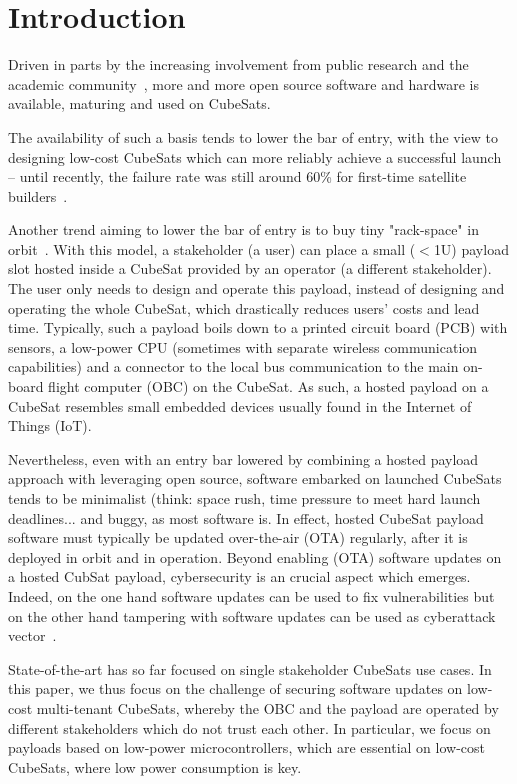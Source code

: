 \section{Introduction}
\label{sec:introduction}

Driven in parts by the increasing involvement from public research and the academic
community~\cite{cubesat101}, more and more open source software and hardware is available,
maturing and used on CubeSats.

The availability of such a basis tends to lower the bar of entry, with the view to
designing low-cost CubeSats which can more reliably achieve a successful launch --
until recently, the failure rate was still around 60\% for first-time satellite
builders~\cite{Holliday2019PyCubed}.

Another trend aiming to lower the bar of entry is to buy tiny "rack-space" in
orbit~\cite{satrevolution2020}. With this model, a stakeholder (a user) can place
a small ($<$1U) payload slot hosted inside a CubeSat provided by an operator
(a different stakeholder). The user only needs to design and operate this payload,
instead of designing and operating the whole CubeSat, which drastically reduces users'
costs and lead time. Typically, such a payload boils down to a printed circuit board
(PCB) with sensors, a low-power CPU (sometimes with separate wireless communication
capabilities) and a connector to the local bus communication to the main on-board
flight computer (OBC) on the CubeSat. As such, a hosted payload on a CubeSat
resembles small embedded devices usually found in the Internet of Things (IoT).

Nevertheless, even with an entry bar lowered by combining a hosted payload approach
with leveraging open source, software embarked on launched CubeSats tends to be
minimalist (think: space rush, time pressure to meet hard launch deadlines...
and buggy, as most software is. In effect, hosted CubeSat payload software must
typically be updated over-the-air (OTA) regularly, after it is deployed in orbit
and in operation. Beyond enabling (OTA) software updates on a hosted CubSat payload,
cybersecurity is an crucial aspect which emerges. Indeed, on the one hand software
updates can  be used to fix vulnerabilities but on the other hand tampering with
software updates can be used as cyberattack vector~\cite{ccleaner}.

State-of-the-art has so far focused on single stakeholder CubeSats use cases. In
this paper, we thus focus on the challenge of securing software updates on low-cost
multi-tenant CubeSats, whereby the OBC and the payload are operated by different
stakeholders which do not trust each other. In particular, we focus on payloads
based on low-power microcontrollers, which are essential on low-cost CubeSats, where
low power consumption is key.

